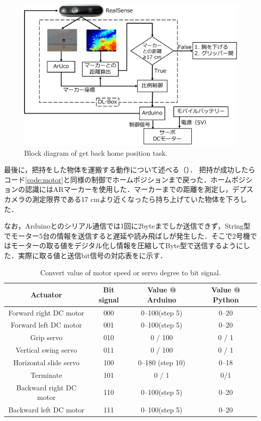 \begin{figure}
    \centering
    \includegraphics[width=0.7\linewidth]{figure/chapter4/2号機制御図_AR-2}
    \caption{Block diagram of get back home position task.}
    \label{fig:2号機AR}
\end{figure}

最後に，把持をした物体を運搬する動作について述べる（）．
把持が成功したらコード\ref{code:motor}と同様の制御でホームポジションまで戻った．ホームポジションの認識にはARマーカーを使用した．マーカーまでの距離を測定し，デプスカメラの測定限界である17 cmより近くなったら持ち上げていた物体を下ろした．

なお，Arduinoとのシリアル通信では1回に2byteまでしか送信できず，String型でモーター5台の情報を送信すると遅延や読み飛ばしが発生した．そこで2号機ではモーターの取る値をデジタル化し情報を圧縮してByte型で送信するようにした．実際に取る値と送信bit信号の対応表をに示す．

\begin{table}
    \centering
    \caption{Convert value of motor speed or servo degree to bit signal.}
    \begin{tabular}{cccc}\toprule
        Actuator & Bit signal & Value @ Arduino & Value @ Python \\ \midrule
        Forward right DC motor & 000 & 0--100(step 5) & 0--20  \\ 
        Forward left DC motor & 001 & 0--100(step 5) & 0--20 \\ 
        Grip servo & 010 & 0 / 100 & 0 / 1\\ 
        Vertical swing servo & 011 & 0 / 100 & 0 / 1\\ 
        Horizontal slide servo & 100 & 0--180 (step 10) & 0--18 \\ 
        Terminate & 101 & 0 / 1 & 0/1 \\ 
        Backward right DC motor & 110 & 0--100(step 5) & 0--20 \\ 
        Backward left DC motor & 111 & 0--100(step 5) & 0--20 \\ \bottomrule
    \end{tabular} 
    \label{tab:2号機信号表}
\end{table}

